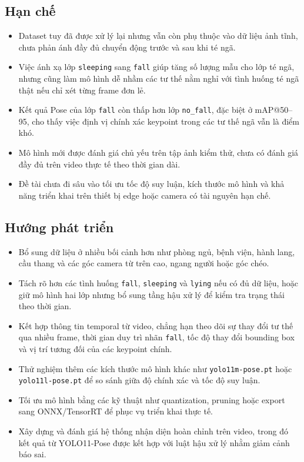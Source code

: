 \documentclass[12pt, a4paper]{article}
\begin{document}
\subsection{Hạn chế}
\begin{itemize}[nosep]
  \item Dataset tuy đã được xử lý lại nhưng vẫn còn phụ thuộc vào dữ liệu ảnh tĩnh, chưa phản ánh đầy đủ chuyển động trước và sau khi té ngã.
  \item Việc ánh xạ lớp \texttt{sleeping} sang \texttt{fall} giúp tăng số lượng mẫu cho lớp té ngã, nhưng cũng làm mô hình dễ nhầm các tư thế nằm nghỉ với tình huống té ngã thật nếu chỉ xét từng frame đơn lẻ.
  \item Kết quả Pose của lớp \texttt{fall} còn thấp hơn lớp \texttt{no\_fall}, đặc biệt ở mAP@50--95, cho thấy việc định vị chính xác keypoint trong các tư thế ngã vẫn là điểm khó.
  \item Mô hình mới được đánh giá chủ yếu trên tập ảnh kiểm thử, chưa có đánh giá đầy đủ trên video thực tế theo thời gian dài.
  \item Đề tài chưa đi sâu vào tối ưu tốc độ suy luận, kích thước mô hình và khả năng triển khai trên thiết bị edge hoặc camera có tài nguyên hạn chế.
\end{itemize}

\subsection{Hướng phát triển}
\begin{itemize}[nosep]
  \item Bổ sung dữ liệu ở nhiều bối cảnh hơn như phòng ngủ, bệnh viện, hành lang, cầu thang và các góc camera từ trên cao, ngang người hoặc góc chéo.
  \item Tách rõ hơn các tình huống \texttt{fall}, \texttt{sleeping} và \texttt{lying} nếu có đủ dữ liệu, hoặc giữ mô hình hai lớp nhưng bổ sung tầng hậu xử lý để kiểm tra trạng thái theo thời gian.
  \item Kết hợp thông tin temporal từ video, chẳng hạn theo dõi sự thay đổi tư thế qua nhiều frame, thời gian duy trì nhãn \texttt{fall}, tốc độ thay đổi bounding box và vị trí tương đối của các keypoint chính.
  \item Thử nghiệm thêm các kích thước mô hình khác như \texttt{yolo11m-pose.pt} hoặc \texttt{yolo11l-pose.pt} để so sánh giữa độ chính xác và tốc độ suy luận.
  \item Tối ưu mô hình bằng các kỹ thuật như quantization, pruning hoặc export sang ONNX/TensorRT để phục vụ triển khai thực tế.
  \item Xây dựng và đánh giá hệ thống nhận diện hoàn chỉnh trên video, trong đó kết quả từ YOLO11-Pose được kết hợp với luật hậu xử lý nhằm giảm cảnh báo sai.
\end{itemize}
\end{document}
